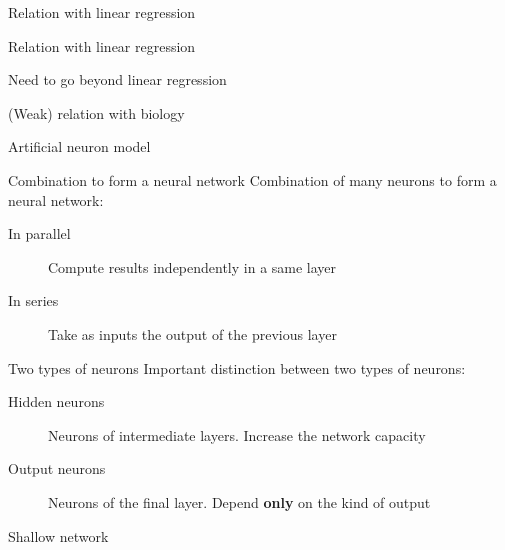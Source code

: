 \begin{frame}{Relation with linear regression}
\end{frame}

\begin{frame}{Relation with linear regression}
\end{frame}

\begin{frame}{Need to go beyond linear regression}
\end{frame}

\begin{frame}{(Weak) relation with biology}
\end{frame}

\begin{frame}{Artificial neuron model}
\end{frame}

\begin{frame}{Combination to form a neural network}
  Combination of many neurons to form a neural network:
  \begin{description}
    \item[In parallel] Compute results independently in a same layer
    \item[In series] Take as inputs the output of the previous layer
  \end{description}
\end{frame}

\begin{frame}{Two types of neurons}
  Important distinction between two types of neurons:
  \begin{description}
    \item[Hidden neurons] Neurons of intermediate layers. Increase the network capacity
    \item[Output neurons] Neurons of the final layer. Depend \textbf{only} on the kind of output
  \end{description}
\end{frame}

\begin{frame}{Shallow network}
  \centering
\end{frame}

